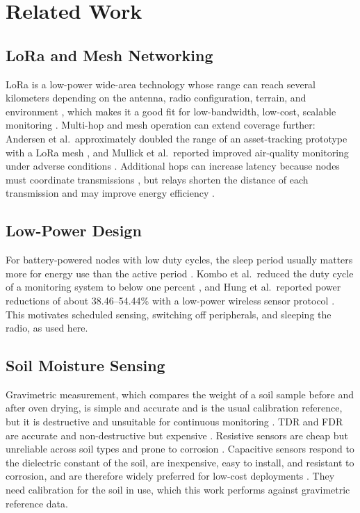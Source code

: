 \section{Related Work}
\subsection{LoRa and Mesh Networking}
LoRa is a low-power wide-area technology whose range can reach several kilometers depending on the antenna, radio configuration, terrain, and environment \cite{centenaro2016longrange}, which makes it a good fit for low-bandwidth, low-cost, scalable monitoring \cite{rahman2018lora}. Multi-hop and mesh operation can extend coverage further: Andersen et al.\ approximately doubled the range of an asset-tracking prototype with a LoRa mesh \cite{andersen2020mesh}, and Mullick et al.\ reported improved air-quality monitoring under adverse conditions \cite{mullick2022mesh}. Additional hops can increase latency because nodes must coordinate transmissions \cite{centelles2021multihop}, but relays shorten the distance of each transmission and may improve energy efficiency \cite{khonrang2022multihop}.

\subsection{Low-Power Design}
For battery-powered nodes with low duty cycles, the sleep period usually matters more for energy use than the active period \cite{hwang2012poweraware}. Kombo et al.\ reduced the duty cycle of a monitoring system to below one percent \cite{kombo2021groundwater}, and Hung et al.\ reported power reductions of about 38.46--54.44\% with a low-power wireless sensor protocol \cite{hung2020lowpower}. This motivates scheduled sensing, switching off peripherals, and sleeping the radio, as used here.

\subsection{Soil Moisture Sensing}
Gravimetric measurement, which compares the weight of a soil sample before and after oven drying, is simple and accurate and is the usual calibration reference, but it is destructive and unsuitable for continuous monitoring \cite{ref24,ref25}. TDR and FDR are accurate and non-destructive but expensive \cite{ref19,ref28}. Resistive sensors are cheap but unreliable across soil types and prone to corrosion \cite{ref28}. Capacitive sensors respond to the dielectric constant of the soil, are inexpensive, easy to install, and resistant to corrosion, and are therefore widely preferred for low-cost deployments \cite{ref33,ref34,ref35,ref36}. They need calibration for the soil in use, which this work performs against gravimetric reference data.

